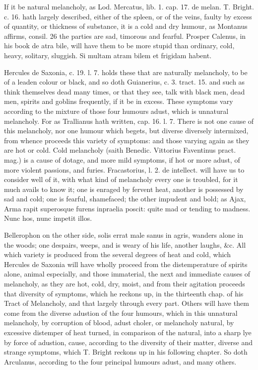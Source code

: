 {If it be natural melancholy, as Lod. Mercatus, lib. 1. cap. 17. de
melan. T. Bright. c. 16. hath largely described, either of the spleen,
or of the veins, faulty by excess of quantity, or thickness of
substance, it is a cold and dry humour, as Montanus affirms, consil. 26
the parties are sad, timorous and fearful. Prosper Calenus, in his book
de atra bile, will have them to be more stupid than ordinary, cold,
heavy, solitary, sluggish. Si multam atram bilem et frigidam habent.

Hercules de Saxonia, c. 19. l. 7. holds these that are naturally
melancholy, to be of a leaden colour or black, and so doth Guianerius,
c. 3. tract. 15. and such as think themselves dead many times, or that
they see, talk with black men, dead men, spirits and goblins
frequently, if it be in excess. These symptoms vary according to the
mixture of those four humours adust, which is unnatural melancholy. For
as Trallianus hath written, cap. 16. l. 7. There is not one cause
of this melancholy, nor one humour which begets, but diverse diversely
intermixed, from whence proceeds this variety of symptoms: and those
varying again as they are hot or cold. Cold melancholy (saith
Benedic. Vittorius Faventinus pract. mag.) is a cause of dotage, and
more mild symptoms, if hot or more adust, of more violent passions, and
furies. Fracastorius, l. 2. de intellect. will have us to consider well
of it, with what kind of melancholy every one is troubled, for it
much avails to know it; one is enraged by fervent heat, another is
possessed by sad and cold; one is fearful, shamefaced; the other
impudent and bold; as Ajax, Arma rapit superosque furens inpraelia
poscit: quite mad or tending to madness. Nunc hos, nunc impetit illos.

Bellerophon on the other side, solis errat male sanus in agris, wanders
alone in the woods; one despairs, weeps, and is weary of his life,
another laughs, \&c. All which variety is produced from the several
degrees of heat and cold, which Hercules de Saxonia will have
wholly proceed from the distemperature of spirits alone, animal
especially, and those immaterial, the next and immediate causes of
melancholy, as they are hot, cold, dry, moist, and from their agitation
proceeds that diversity of symptoms, which he reckons up, in the
thirteenth chap. of his Tract of Melancholy, and that largely
through every part. Others will have them come from the diverse
adustion of the four humours, which in this unnatural melancholy, by
corruption of blood, adust choler, or melancholy natural, by
excessive distemper of heat turned, in comparison of the natural, into
a sharp lye by force of adustion, cause, according to the diversity of
their matter, diverse and strange symptoms, which T. Bright reckons up
in his following chapter. So doth Arculanus, according to the
four principal humours adust, and many others.

}
